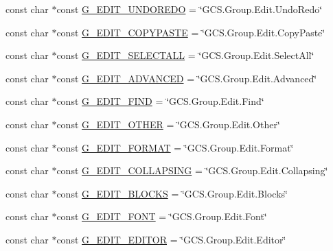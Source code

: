 \begin{DoxyCompactItemize}
\item 
const char $\ast$const \hyperlink{group___core_plugin_ga2975c00095be592f9dc54342040fe08b}{\-G\-\_\-\-E\-D\-I\-T\-\_\-\-U\-N\-D\-O\-R\-E\-D\-O} = \char`\"{}\-G\-C\-S.\-Group.\-Edit.\-Undo\-Redo\char`\"{}
\item 
const char $\ast$const \hyperlink{group___core_plugin_ga6713439b668227888c67cb139db0a617}{\-G\-\_\-\-E\-D\-I\-T\-\_\-\-C\-O\-P\-Y\-P\-A\-S\-T\-E} = \char`\"{}\-G\-C\-S.\-Group.\-Edit.\-Copy\-Paste\char`\"{}
\item 
const char $\ast$const \hyperlink{group___core_plugin_gaa884d741f6c93335368ca06c9385686d}{\-G\-\_\-\-E\-D\-I\-T\-\_\-\-S\-E\-L\-E\-C\-T\-A\-L\-L} = \char`\"{}\-G\-C\-S.\-Group.\-Edit.\-Select\-All\char`\"{}
\item 
const char $\ast$const \hyperlink{group___core_plugin_ga8c4e9323975b84f0aa8c1441ea913b4e}{\-G\-\_\-\-E\-D\-I\-T\-\_\-\-A\-D\-V\-A\-N\-C\-E\-D} = \char`\"{}\-G\-C\-S.\-Group.\-Edit.\-Advanced\char`\"{}
\item 
const char $\ast$const \hyperlink{group___core_plugin_ga6ecc58afd57743a48547fde417de7b7b}{\-G\-\_\-\-E\-D\-I\-T\-\_\-\-F\-I\-N\-D} = \char`\"{}\-G\-C\-S.\-Group.\-Edit.\-Find\char`\"{}
\item 
const char $\ast$const \hyperlink{group___core_plugin_ga31fd4c00dfea19dfd2a96d293f1e86ea}{\-G\-\_\-\-E\-D\-I\-T\-\_\-\-O\-T\-H\-E\-R} = \char`\"{}\-G\-C\-S.\-Group.\-Edit.\-Other\char`\"{}
\item 
const char $\ast$const \hyperlink{group___core_plugin_gae220a227e5bf352b19abf50093720c21}{\-G\-\_\-\-E\-D\-I\-T\-\_\-\-F\-O\-R\-M\-A\-T} = \char`\"{}\-G\-C\-S.\-Group.\-Edit.\-Format\char`\"{}
\item 
const char $\ast$const \hyperlink{group___core_plugin_ga5765170a2baf55a34033de3abf016362}{\-G\-\_\-\-E\-D\-I\-T\-\_\-\-C\-O\-L\-L\-A\-P\-S\-I\-N\-G} = \char`\"{}\-G\-C\-S.\-Group.\-Edit.\-Collapsing\char`\"{}
\item 
const char $\ast$const \hyperlink{group___core_plugin_ga975093fc4492408a339657e017d7ef52}{\-G\-\_\-\-E\-D\-I\-T\-\_\-\-B\-L\-O\-C\-K\-S} = \char`\"{}\-G\-C\-S.\-Group.\-Edit.\-Blocks\char`\"{}
\item 
const char $\ast$const \hyperlink{group___core_plugin_gaa9facf2424e9b026dd0726ef0c4c69a7}{\-G\-\_\-\-E\-D\-I\-T\-\_\-\-F\-O\-N\-T} = \char`\"{}\-G\-C\-S.\-Group.\-Edit.\-Font\char`\"{}
\item 
const char $\ast$const \hyperlink{group___core_plugin_ga409a8db932ed17224f0e72e856797fba}{\-G\-\_\-\-E\-D\-I\-T\-\_\-\-E\-D\-I\-T\-O\-R} = \char`\"{}\-G\-C\-S.\-Group.\-Edit.\-Editor\char`\"{}

\end{DoxyCompactItemize}
